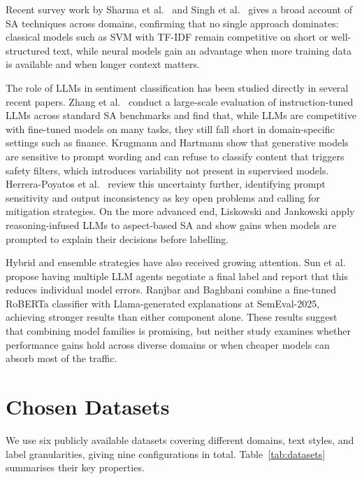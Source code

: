 \documentclass[conference]{IEEEtran}
\begin{document}
Recent survey work by Sharma et al.\ \cite{sharma2025review} and Singh et al.\ \cite{singh2020sentiment} gives a broad account of SA techniques across domains, confirming that no single approach dominates: classical models such as SVM with TF-IDF remain competitive on short or well-structured text, while neural models gain an advantage when more training data is available and when longer context matters.

The role of LLMs in sentiment classification has been studied directly in several recent papers. Zhang et al.\ \cite{zhang2024sentiment} conduct a large-scale evaluation of instruction-tuned LLMs across standard SA benchmarks and find that, while LLMs are competitive with fine-tuned models on many tasks, they still fall short in domain-specific settings such as finance. Krugmann and Hartmann \cite{sa-in-age-of-genai} show that generative models are sensitive to prompt wording and can refuse to classify content that triggers safety filters, which introduces variability not present in supervised models. Herrera-Poyatos et al.\ \cite{herrera2025overview} review this uncertainty further, identifying prompt sensitivity and output inconsistency as key open problems and calling for mitigation strategies. On the more advanced end, Liskowski and Jankowski \cite{liskowski2026large} apply reasoning-infused LLMs to aspect-based SA and show gains when models are prompted to explain their decisions before labelling.

Hybrid and ensemble strategies have also received growing attention. Sun et al.\ \cite{sun2023sentiment} propose having multiple LLM agents negotiate a final label and report that this reduces individual model errors. Ranjbar and Baghbani \cite{ranjbar2025lotus} combine a fine-tuned RoBERTa classifier with Llama-generated explanations at SemEval-2025, achieving stronger results than either component alone. These results suggest that combining model families is promising, but neither study examines whether performance gains hold across diverse domains or when cheaper models can absorb most of the traffic.

\section{Chosen Datasets}
\label{sec:datasets}

We use six publicly available datasets covering different domains, text styles, and label granularities, giving nine configurations in total. Table~\ref{tab:datasets} summarises their key properties.
\end{document}
